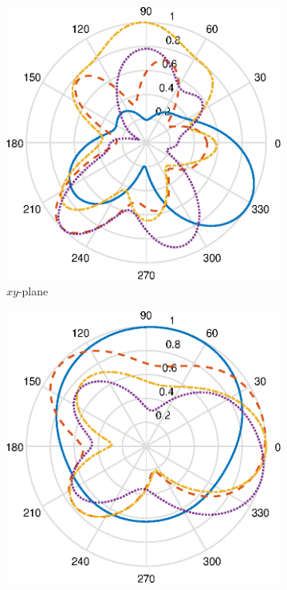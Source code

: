 \begin{figure}[H]
    \vspace{-9pt}
    \centering
    \begin{subfigure}[b]{0.26\textwidth}
        \includegraphics[width=\textwidth]{img/ff_cell_xy.eps}
        \caption{$xy$-plane}
        \label{fig:ff_xy_cell}
    \end{subfigure}
    \begin{subfigure}[b]{0.26\textwidth}
        \includegraphics[width=\textwidth]{img/ff_cell_xz.eps}

\end{subfigure}
\end{figure}
